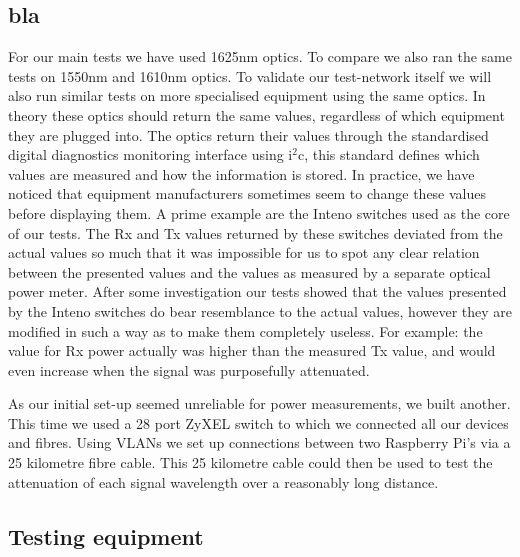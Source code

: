 \documentclass{article}
\begin{document}
\subsection{bla}
For our main tests we have used 1625nm optics.
To compare we also ran the same tests on 1550nm and 1610nm optics.
To validate our test-network itself we will also run similar tests on more specialised equipment using the same optics.
In theory these optics should return the same values, regardless of which equipment they are plugged into.
The optics return their values through the standardised digital diagnostics monitoring interface using i$^2$c, this standard defines which values are measured and how the information is stored.\cite{SFF:DDM}
In practice, we have noticed that equipment manufacturers sometimes seem to change these values before displaying them.
A prime example are the Inteno switches used as the core of our tests.
The Rx and Tx values returned by these switches deviated from the actual values so much that it was impossible for us to spot any clear relation between the presented values and the values as measured by a separate optical power meter.
After some investigation our tests showed that the values presented by the Inteno switches do bear resemblance to the actual values, however they are modified in such a way as to make them completely useless.
For example: the value for Rx power actually was higher than the measured Tx value, and would even increase when the signal was purposefully attenuated.

As our initial set-up seemed unreliable for power measurements, we built another.  This time we used a 28 port ZyXEL switch to which we connected all our devices and fibres.
Using VLANs we set up connections between two Raspberry Pi's via a 25 kilometre fibre cable.
This 25 kilometre cable could then be used to test the attenuation of each signal wavelength over a reasonably long distance.

\subsection{Testing equipment}
\end{document}
